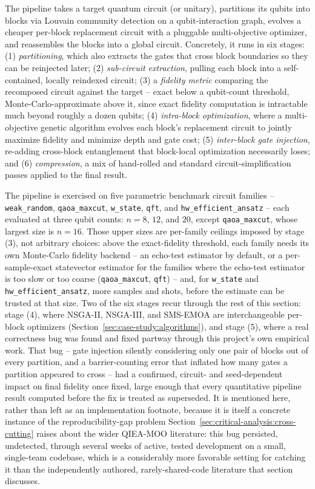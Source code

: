 The pipeline takes a target quantum circuit (or unitary), partitions its
qubits into blocks via Louvain community detection on a qubit-interaction
graph, evolves a cheaper per-block replacement circuit with a pluggable
multi-objective optimizer, and reassembles the blocks into a global
circuit. Concretely, it runs in six stages: (1) \emph{partitioning},
which also extracts the gates that cross block boundaries so they can be
reinjected later; (2) \emph{sub-circuit extraction}, pulling each block
into a self-contained, locally reindexed circuit; (3) a \emph{fidelity
metric} comparing the recomposed circuit against the target -- exact
below a qubit-count threshold, Monte-Carlo-approximate above it, since
exact fidelity computation is intractable much beyond roughly a dozen
qubits; (4) \emph{intra-block optimization}, where a multi-objective
genetic algorithm evolves each block's replacement circuit to jointly
maximize fidelity and minimize depth and gate cost; (5) \emph{inter-block
gate injection}, re-adding cross-block entanglement that block-local
optimization necessarily loses; and (6) \emph{compression}, a mix of
hand-rolled and standard circuit-simplification passes applied to the
final result.

The pipeline is exercised on five parametric benchmark circuit families
-- \texttt{weak\_random}, \texttt{qaoa\_maxcut}, \texttt{w\_state},
\texttt{qft}, and \texttt{hw\_efficient\_ansatz} -- each evaluated at
three qubit counts: $n{=}8$, $12$, and $20$, except
\texttt{qaoa\_maxcut}, whose largest size is $n{=}16$. Those upper
sizes are per-family ceilings imposed by stage (3), not arbitrary
choices: above the exact-fidelity threshold, each family needs its own
Monte-Carlo fidelity backend -- an echo-test estimator by default, or a
per-sample-exact statevector estimator for the families where the
echo-test estimator is too slow or too coarse (\texttt{qaoa\_maxcut},
\texttt{qft}) -- and, for \texttt{w\_state} and
\texttt{hw\_efficient\_ansatz}, more samples and shots, before the estimate can be trusted at
that size. Two of the six stages recur through the rest of this
section: stage (4), where NSGA-II, NSGA-III, and SMS-EMOA are
interchangeable per-block optimizers (Section~\ref{sec:case-study:algorithms}),
and stage (5), where a real correctness bug was found and fixed partway
through this project's own empirical work. That bug -- gate injection
silently considering only one pair of blocks out of every partition,
and a barrier-counting error that inflated how many gates a partition
appeared to cross -- had a confirmed, circuit- and seed-dependent impact
on final fidelity once fixed, large enough that every quantitative
pipeline result computed before the fix is treated as superseded. It is
mentioned here, rather than left as an implementation footnote, because
it is itself a concrete instance of the reproducibility-gap problem
Section~\ref{sec:critical-analysis:cross-cutting} raises about the wider
QIEA-MOO literature: this bug persisted, undetected, through several
weeks of active, tested development on a small, single-team codebase,
which is a considerably more favorable setting for catching it than the
independently authored, rarely-shared-code literature that section
discusses.

